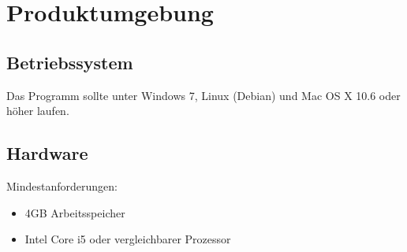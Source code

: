 \section{Produktumgebung}

\subsection{Betriebssystem}
  Das Programm sollte unter Windows 7, Linux (Debian) und Mac OS X 10.6 oder höher laufen.
  
\subsection{Hardware}
  Mindestanforderungen: 
  \begin{itemize}
    \item 4GB Arbeitsspeicher
    \item Intel Core i5 oder vergleichbarer Prozessor
  \end{itemize}